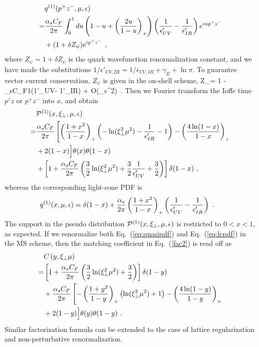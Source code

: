 \begin{align}
&q^{(1)}(p^+z^-,\mu,\epsilon)\nonumber\\
=&{\alpha_sC_F\over 2\pi}\int_0^1 du \left(1-u+\left({2u\over 1-u}\right)_+\right)\left({1\over \epsilon'_{UV}}- {1\over \epsilon'_{IR}}\right)e^{iu p^+ z^-}\nonumber\\
& + (1+\delta Z_\psi)e^{i p^+ z^-} \ ,
\end{align}
where $Z_\psi = 1+ \delta Z_\psi$ is the quark wavefunction renormalization constant, and we have made the substitutions $1/\epsilon'_{UV,IR} = 1/\epsilon_{UV,IR}+\gamma_E+\ln\pi$. To guarantee vector current conservation, $Z_\psi$ is given in the on-shell scheme,
\beq
Z_\psi = 1 - {\alpha_sC_F\pi}{1}\left({1\over \epsilon'_{UV}}- {1\over \epsilon'_{IR}}\right) + O(\alpha_s^2)\ .
\eeq
Then we Fourier transform the Ioffe time $p^z z$ or $p^+z^-$ into $x$, and obtain
\begin{align} \label{eq:quasipdf}
&{\cal P}^{(1)}(x,\xi_\perp,\mu,\epsilon)\nonumber\\
=&{\alpha_sC_F\over 2\pi}\left[\left({1+x^2\over 1-x}\right)_+\left(-\ln(\xi_\perp^2 \mu^2) - {1\over \epsilon'_{IR}}-1\right)  - \left(4\ln(1-x)\over 1-x\right)_+  \right.\nonumber\\
&+2(1-x)\Big]\theta(x)\theta(1-x)\nonumber\\
&  +\left[ 1+ {\alpha_sC_F\over 2\pi}\left({3\over2}\ln(\xi_\perp^2\mu^2) + {3\over2}{1\over \epsilon'_{UV}}+{3\over2}\right)\right]\delta(1-x) \ ,
\end{align}
whereas the corresponding light-cone PDF is
\begin{align} \label{eq:lcpdf}
q^{(1)}(x,\mu,\epsilon) &= \delta(1-x) + {\alpha_s\over 2\pi}\left({1+x^2\over 1-x}\right)_+\left({1\over\epsilon'_{UV}} - {1\over \epsilon'_{IR}}\right)\ .
\end{align}
The support in the pseudo distribution ${\cal P}^{(1)}(x,\xi_\perp,\mu,\epsilon)$ is restricted to $0<x<1$, as expected.
If we renormalize both Eq.~(\ref{eq:quasipdf}) and Eq.~(\ref{eq:lcpdf}) in the $\overline{\text{MS}}$ scheme, then the matching coefficient in Eq.~(\ref{fac2}) is read off as
\begin{align}
&C\left(y,\xi_\perp\mu\right)\nonumber\\
=& \left[1+{\alpha_sC_F\over 2\pi}\left({3\over2}\ln(\xi_\perp^2\mu^2)+{3\over2}\right)\right] \delta(1-y)\nonumber\\
& + {\alpha_sC_F\over 2\pi} \left[-\left({1+y^2\over 1-y}\right)_+\left(\ln(\xi_\perp^2 \mu^2) +1 \right)- \left(4\ln(1-y)\over 1-y\right)_+ \right.\nonumber\\
&+2(1-y)\Big]\theta(y)\theta(1-y)\ .
\end{align}
\noindent
Similar factorization formula can be extended to the case of lattice regularization and non-perturbative renormalization.

